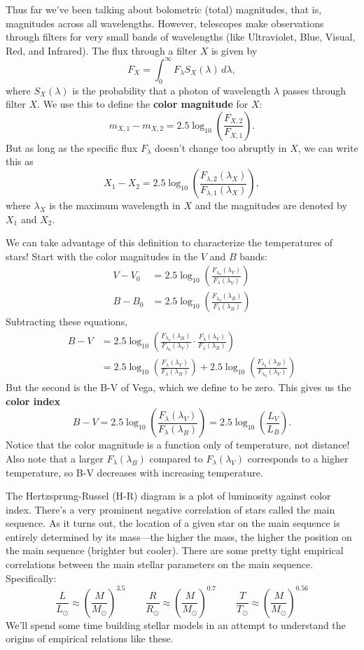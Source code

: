 \documentclass[../a062main.tex]{subfiles}
\begin{document}
Thus far we've been talking about bolometric (total) magnitudes, that is, magnitudes across all wavelengths.
However, telescopes make observations through filters for very small bands of wavelengths (like Ultraviolet, Blue, Visual, Red, and Infrared).
The flux through a filter $X$ is given by
\[ F_X = \int_{0}^{\infty} F_\lambda S_X(\lambda) \,d\lambda, \]
where $S_X(\lambda)$ is the probability that a photon of wavelength $\lambda$ passes through filter $X$.
We use this to define the \textbf{color magnitude} for $X$:
\[ m_{X,1} - m_{X,2} = 2.5 \log_{10} \left( \frac{F_{X,2}}{F_{X,1}} \right). \]
But as long as the specific flux $F_\lambda$ doesn't change too abruptly in $X$, we can write this as
\[ \boxed{X_1 - X_2 = 2.5 \log_{10} \left( \frac{F_{\lambda, 2} (\lambda_X)}{F_{\lambda, 1} (\lambda_X)} \right)}, \]
where $\lambda_X$ is the maximum wavelength in $X$ and the magnitudes are denoted by $X_1$ and $X_2$.

We can take advantage of this definition to characterize the temperatures of stars!
Start with the color magnitudes in the $V$ and $B$ bands:
\begin{align*}
    V - V_0 &= 2.5 \log_{10} \left( \frac{F_{\lambda_0} (\lambda_V)}{F_\lambda (\lambda_V)} \right) \\
    B - B_0 &= 2.5 \log_{10} \left( \frac{F_{\lambda_0} (\lambda_B)}{F_\lambda (\lambda_B)} \right)
\end{align*}
Subtracting these equations,
\begin{align*}
    B - V &= 2.5 \log_{10} \left( \frac{F_{\lambda_0} (\lambda_B)}{F_{\lambda_0} (\lambda_V)} \cdot \frac{F_{\lambda} (\lambda_V)}{F_{\lambda} (\lambda_B)} \right) \\
    &= 2.5 \log_{10} \left( \frac{F_{\lambda} (\lambda_V)}{F_{\lambda} (\lambda_B)} \right) + 2.5 \log_{10} \left( \frac{F_{\lambda_0} (\lambda_B)}{F_{\lambda_0} (\lambda_V)} \right)
\end{align*}
But the second is the B-V of Vega, which we define to be zero.
This gives us the \textbf{color index}
\[ \boxed{B - V = 2.5 \log_{10} \left( \frac{F_{\lambda} (\lambda_V)}{F_{\lambda} (\lambda_B)} \right) = 2.5 \log_{10} \left( \frac{L_V}{L_B} \right)}. \]
Notice that the color magnitude is a function only of temperature, not distance!
Also note that a larger $F_\lambda (\lambda_B)$ compared to $F_\lambda (\lambda_V)$ corresponds to a higher temperature, so B-V decreases with increasing temperature.

The Hertzsprung-Russel (H-R) diagram is a plot of luminosity against color index.
There's a very prominent negative correlation of stars called the main sequence.
As it turns out, the location of a given star on the main sequence is entirely determined by its mass---the higher the mass, the higher the position on the main sequence (brighter but cooler).
There are some pretty tight empirical correlations between the main stellar parameters on the main sequence.
Specifically:
\[ \frac{L}{L_\odot} \approx \left( \frac{M}{M_\odot} \right)^{3.5} \qquad \frac{R}{R_\odot} \approx \left( \frac{M}{M_\odot} \right)^{0.7} \qquad \frac{T}{T_\odot} \approx \left( \frac{M}{M_\odot} \right)^{0.56} \]
We'll spend some time building stellar models in an attempt to understand the origins of empirical relations like these.

\end{document}
